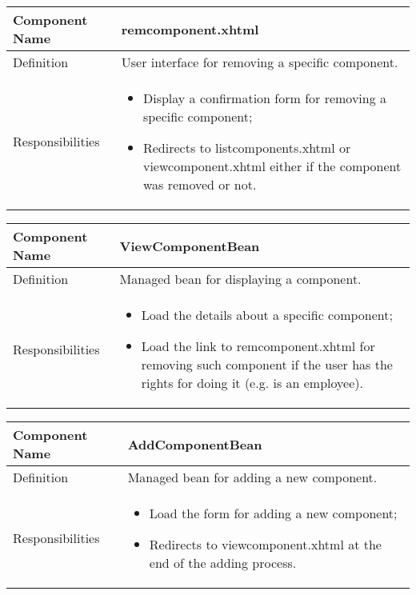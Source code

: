 \documentclass[a4paper,12pt]{book}
\begin{document}
\begin{center}
  \begin{tabular}{ | p{3.3cm} | p{11.7cm} | }
    \hline
    Component Name & \textbf{remcomponent.xhtml} \\ \hline
    Definition & User interface for removing a specific component. \\ \hline
    Responsibilities & \parbox{0.65\textwidth}{
      \begin{itemize}[noitemsep,leftmargin=*]
        \item Display a confirmation form for removing a specific component;
        \item Redirects to listcomponents.xhtml or viewcomponent.xhtml either if the component was removed or not.
      \end{itemize}} \\ \hline
    \end{tabular}
  \end{center}
\begin{center}
  \begin{tabular}{ | p{3.3cm} | p{11.7cm} | }
    \hline
    Component Name & \textbf{ViewComponentBean} \\ \hline
    Definition & Managed bean for displaying a component. \\ \hline
    Responsibilities & \parbox{0.65\textwidth}{
      \begin{itemize}[noitemsep,leftmargin=*]
        \item Load the details about a specific component;
        \item Load the link to remcomponent.xhtml for removing such component if the user has the rights for doing it (e.g. is an employee).
      \end{itemize}} \\ \hline
    \end{tabular}
  \end{center}
  \begin{center}
    \begin{tabular}{ | p{3.3cm} | p{11.7cm} | }
      \hline
      Component Name & \textbf{AddComponentBean} \\ \hline
      Definition & Managed bean for adding a new component. \\ \hline
      Responsibilities & \parbox{0.65\textwidth}{
        \begin{itemize}[noitemsep,leftmargin=*]
          \item Load the form for adding a new component;
          \item Redirects to viewcomponent.xhtml at the end of the adding process.
        \end{itemize}} \\ \hline
      \end{tabular}
    \end{center}
\end{document}
